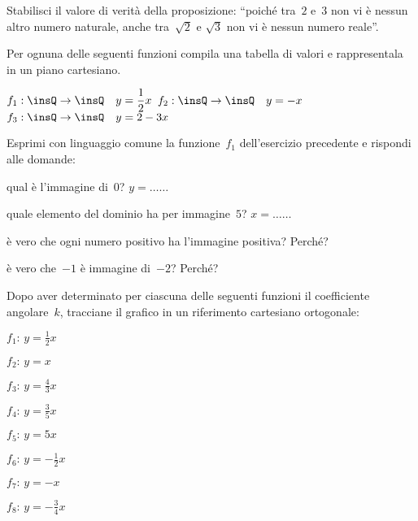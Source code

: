 \begin{esercizio}
\label{ese:D.17}
Stabilisci il valore di verità della proposizione: ``poiché tra~$2$ e~$3$ non vi 
è nessun altro numero naturale, anche tra~$\sqrt{2}$ e
$\sqrt{3}$ non vi è nessun numero reale''.
\end{esercizio}


\begin{esercizio}
\label{ese:D.37}
Per ognuna delle seguenti funzioni compila una tabella di valori e 
rappresentala in un piano cartesiano.

 $f_1:\insQ \rightarrow \insQ\quad y=\dfrac{1}{2}x$ \quad
 $f_2:\insQ \rightarrow \insQ\quad y=-x$ \quad
 $f_3:\insQ \rightarrow \insQ\quad y=2-3x$
\end{esercizio}

\begin{esercizio}
\label{ese:D.38}
Esprimi con linguaggio comune la funzione~$f_1$ dell'esercizio precedente e 
rispondi alle domande:

\begin{enumeratea}
\item qual è l'immagine di~$0$?  $y=\ldots \ldots $
\item quale elemento del dominio ha per immagine~$5$? $x=\ldots \ldots $
\item è vero che ogni numero positivo ha l'immagine positiva? Perché?
\item è vero che~$-1$ è immagine di~$-2$? Perché?
\end{enumeratea}
\end{esercizio}

\begin{esercizio}
\label{ese:D.39}
Dopo aver determinato per ciascuna delle seguenti funzioni il coefficiente 
angolare~$k$, tracciane il grafico in un riferimento cartesiano ortogonale:
\begin{multicols}{3}
 \begin{enumeratea}
\item $f_{1}:\, y=\frac{1}{2}x$
\item $f_{2}:\, y=x$
\item $f_{3}:\, y=\frac{4}{3}x$
\item $f_{4}:\, y=\frac{3}{5}x$
\item $f_{5}:\, y=5x$
\item $f_{6}:\, y=-{\frac{1}{2}}x$
\item $f_{7}:\, y=-x$
\item $f_{8}:\, y=-{\frac{3}{4}}x$
\end{enumeratea}
\end{multicols}
\end{esercizio}


